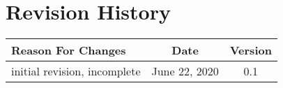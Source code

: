 \chapter*{Revision History}
\begin{center}
    \begin{tabular}{|p{4in}|c|c|}
        \hline
        Reason For Changes \hfill & Date & Version\\
        \hline initial revision, incomplete & June 22, 2020 & 0.1 \\
        \hline
    \end{tabular}
\end{center}
